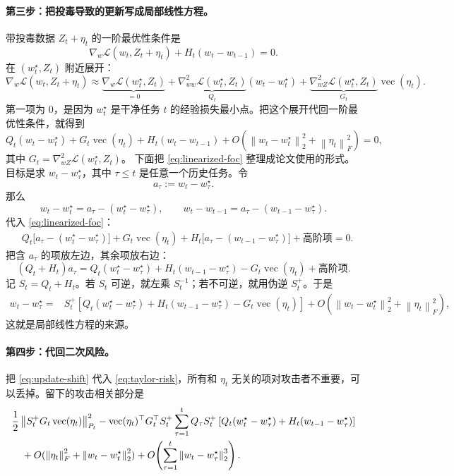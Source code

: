\documentclass[UTF8,fontset=none,11pt]{ctexart}
\theoremstyle{cnstyle}
\newcommand{\vect}{\operatorname{vec}}
\newcommand{\calL}{\mathcal{L}}
\newcommand{\norm}[1]{\left\lVert #1\right\rVert}
\newcommand{\fnorm}[1]{\left\lVert #1\right\rVert_F}
\begin{document}
\paragraph{第三步：把投毒导致的更新写成局部线性方程。}
带投毒数据 \(Z_t+\eta_t\) 的一阶最优性条件是
\[
  \nabla_w\calL(w_t,Z_t+\eta_t)+H_t(w_t-w_{t-1})=0 .
\]
在 \((w_t^\star,Z_t)\) 附近展开：
\[
  \nabla_w\calL(w_t,Z_t+\eta_t)
  \approx
  \underbrace{\nabla_w\calL(w_t^\star,Z_t)}_{=0}
  +
  \underbrace{\nabla_{ww}^2\calL(w_t^\star,Z_t)}_{Q_t}
  (w_t-w_t^\star)
  +
  \underbrace{\nabla_{wZ}^2\calL(w_t^\star,Z_t)}_{G_t}
  \vect(\eta_t).
\]
第一项为 0，是因为 \(w_t^\star\) 是干净任务 \(t\) 的经验损失最小点。把这个展开代回一阶最优性条件，就得到
\begin{equation}
  Q_t(w_t-w_t^\star)
  +G_t\vect(\eta_t)
  +H_t(w_t-w_{t-1})
  +O(\norm{w_t-w_t^\star}_2^2+\fnorm{\eta_t}^2)=0,
  \label{eq:linearized-foc}
\end{equation}
其中 \(G_t=\nabla_{wZ}^2\calL(w_t^\star,Z_t)\)。
下面把 \eqref{eq:linearized-foc} 整理成论文使用的形式。目标是求 \(w_t-w_\tau^\star\)，其中 \(\tau\le t\) 是任意一个历史任务。令
\[
  a_\tau:=w_t-w_\tau^\star.
\]
那么
\[
  w_t-w_t^\star
  =
  a_\tau-(w_t^\star-w_\tau^\star),
  \qquad
  w_t-w_{t-1}
  =
  a_\tau-(w_{t-1}-w_\tau^\star).
\]
代入 \eqref{eq:linearized-foc}：
\begin{align*}
  &Q_t\bigl[a_\tau-(w_t^\star-w_\tau^\star)\bigr]
  +G_t\vect(\eta_t)
  +H_t\bigl[a_\tau-(w_{t-1}-w_\tau^\star)\bigr]
  +\text{高阶项}
  =0.
\end{align*}
把含 \(a_\tau\) 的项放左边，其余项放右边：
\[
  (Q_t+H_t)a_\tau
  =
  Q_t(w_t^\star-w_\tau^\star)
  +H_t(w_{t-1}-w_\tau^\star)
  -G_t\vect(\eta_t)
  +\text{高阶项}.
\]
记 \(S_t=Q_t+H_t\)。若 \(S_t\) 可逆，就左乘 \(S_t^{-1}\)；若不可逆，就用伪逆 \(S_t^+\)。于是
\begin{align}
  w_t-w_\tau^\star
  =&
  S_t^+
  \left[
    Q_t(w_t^\star-w_\tau^\star)
    +H_t(w_{t-1}-w_\tau^\star)
    -G_t\vect(\eta_t)
  \right]
  +O(\norm{w_t-w_t^\star}_2^2+\fnorm{\eta_t}^2),
  \label{eq:update-shift}
\end{align}
这就是局部线性方程的来源。

\paragraph{第四步：代回二次风险。}
把 \eqref{eq:update-shift} 代入 \eqref{eq:taylor-risk}，所有和 \(\eta_t\) 无关的项对攻击者不重要，可以丢掉。留下的攻击相关部分是
\begin{align}
  &
  \frac12\norm{S_t^+G_t\vect(\eta_t)}_{P_t}^2
  -
  \vect(\eta_t)^\top G_t^\top S_t^+
  \sum_{\tau=1}^t
  Q_\tau S_t^+
  \left[
    Q_t(w_t^\star-w_\tau^\star)
    +H_t(w_{t-1}-w_\tau^\star)
  \right]
  \notag\\
  &\quad
  +O(\fnorm{\eta_t}^2+\norm{w_t-w_t^\star}_2^2)
  +O\!\left(\sum_{\tau=1}^t\norm{w_t-w_\tau^\star}_2^3\right).
  \label{eq:attack-expansion}
\end{align}
\end{document}
